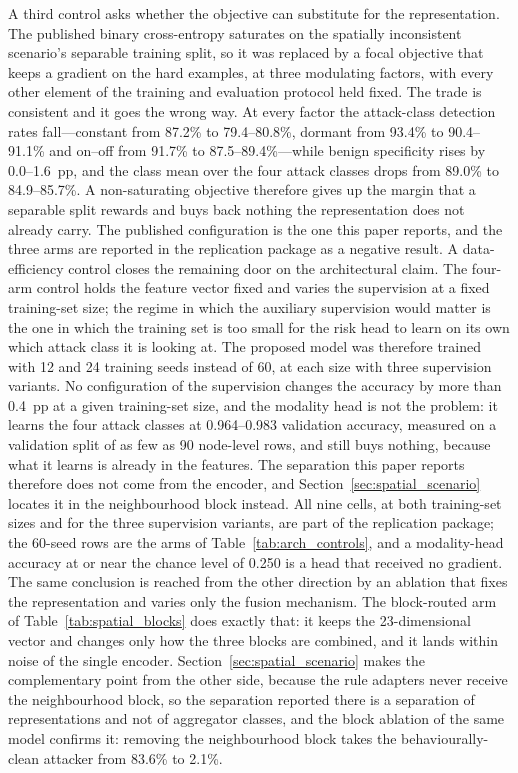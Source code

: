\documentclass[notspecified,article,submit,moreauthors]{Definitions/mdpi}
\begin{document}
A third control asks whether the objective can substitute for the representation. The published binary cross-entropy saturates on the spatially inconsistent scenario's separable training split, so it was replaced by a focal objective that keeps a gradient on the hard examples, at three modulating factors, with every other element of the training and evaluation protocol held fixed. The trade is consistent and it goes the wrong way. At every factor the attack-class detection rates fall---constant from 87.2\% to 79.4--80.8\%, dormant from 93.4\% to 90.4--91.1\% and on--off from 91.7\% to 87.5--89.4\%---while benign specificity rises by 0.0--1.6~pp, and the class mean over the four attack classes drops from 89.0\% to 84.9--85.7\%. A non-saturating objective therefore gives up the margin that a separable split rewards and buys back nothing the representation does not already carry. The published configuration is the one this paper reports, and the three arms are reported in the replication package as a negative result.
A data-efficiency control closes the remaining door on the architectural claim. The four-arm control holds the feature vector fixed and varies the supervision at a fixed training-set size; the regime in which the auxiliary supervision would matter is the one in which the training set is too small for the risk head to learn on its own which attack class it is looking at. The proposed model was therefore trained with 12 and 24 training seeds instead of 60, at each size with three supervision variants. No configuration of the supervision changes the accuracy by more than 0.4~pp at a given training-set size, and the modality head is not the problem: it learns the four attack classes at 0.964--0.983 validation accuracy, measured on a validation split of as few as 90 node-level rows, and still buys nothing, because what it learns is already in the features. The separation this paper reports therefore does not come from the encoder, and Section~\ref{sec:spatial_scenario} locates it in the neighbourhood block instead. All nine cells, at both training-set sizes and for the three supervision variants, are part of the replication package; the 60-seed rows are the arms of Table~\ref{tab:arch_controls}, and a modality-head accuracy at or near the chance level of 0.250 is a head that received no gradient.
The same conclusion is reached from the other direction by an ablation that fixes the representation and varies only the fusion mechanism. The block-routed arm of Table~\ref{tab:spatial_blocks} does exactly that: it keeps the 23-dimensional vector and changes only how the three blocks are combined, and it lands within noise of the single encoder. Section~\ref{sec:spatial_scenario} makes the complementary point from the other side, because the rule adapters never receive the neighbourhood block, so the separation reported there is a separation of representations and not of aggregator classes, and the block ablation of the same model confirms it: removing the neighbourhood block takes the behaviourally-clean attacker from 83.6\% to 2.1\%.
\end{document}
